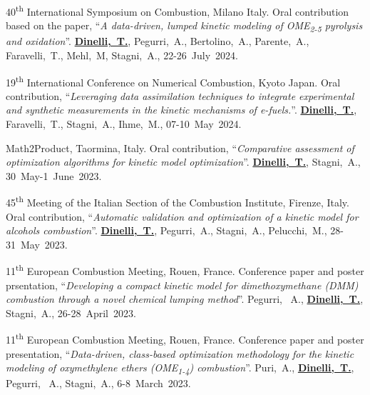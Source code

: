 \begin{etaremune}
   \item
      40\textsuperscript{th} International Symposium on Combustion, Milano Italy. Oral
      contribution based on the paper, ``{\it A data-driven, lumped kinetic modeling of
      OME\textsubscript{2-5} pyrolysis and oxidation}''. {\bf \underline{Dinelli,~T.}},
      Pegurri,~A., Bertolino,~A., Parente,~A., Faravelli,~T., Mehl,~M, Stagni,~A.,
      22-26~July~2024.

   \item
      19\textsuperscript{th} International Conference on Numerical Combustion, Kyoto
      Japan. Oral contribution, ``{\it Leveraging data assimilation techniques to
      integrate experimental and synthetic measurements in the kinetic mechanisms of
      e-fuels.}''. {\bf \underline{Dinelli,~T.}}, Faravelli,~T., Stagni,~A., Ihme,~M.,
      07-10~May~2024.

   \item
      Math2Product, Taormina, Italy. Oral contribution, ``{\it Comparative
      assessment of optimization algorithms for kinetic model optimization}''.
      {\bf \underline{Dinelli,~T.}}, Stagni,~A.,
      30~May-1~June~2023.

   \item
      45\textsuperscript{th} Meeting of the Italian Section of the Combustion Institute,
      Firenze, Italy. Oral contribution, ``{\it Automatic validation and optimization
      of a kinetic model for alcohols combustion}''. {\bf \underline{Dinelli,~T.}},
      Pegurri,~A., Stagni,~A., Pelucchi,~M.,
      28-31~May~2023.

   \item
      11\textsuperscript{th} European Combustion Meeting, Rouen, France. Conference paper
      and poster prsentation, ``{\it Developing a compact kinetic model for
      dimethoxymethane (DMM) combustion through a novel chemical lumping method}''.
      Pegurri, ~A., {\bf \underline{Dinelli,~T.}}, Stagni,~A.,
      26-28~April~2023.

   \item
      11\textsuperscript{th} European Combustion Meeting, Rouen, France. Conference paper
      and poster presentation, ``{\it Data-driven, class-based optimization methodology
      for the kinetic modeling of oxymethylene ethers (OME\textsubscript{1-4}) combustion}''.
      Puri,~A., {\bf \underline{Dinelli,~T.}}, Pegurri, ~A., Stagni,~A.,
      6-8~March~2023.


\end{etaremune}
